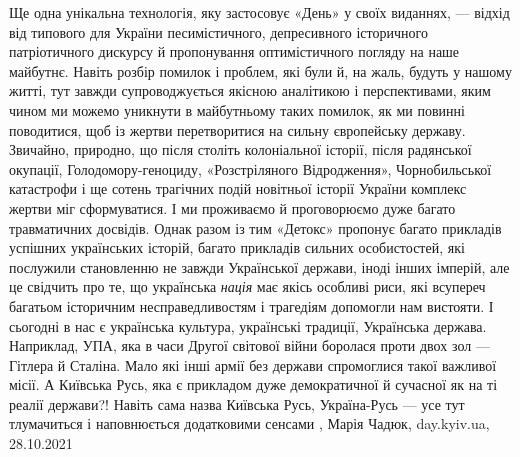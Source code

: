 Ще одна унікальна технологія, яку застосовує «День» у своїх виданнях, — відхід
від типового для України песимістичного, депресивного історичного патріотичного
дискурсу й пропонування оптимістичного погляду на наше майбутнє. Навіть розбір
помилок і проблем, які були й, на жаль, будуть у нашому житті, тут завжди
супроводжується якісною аналітикою і перспективами, яким чином ми можемо
уникнути в майбутньому таких помилок, як ми повинні поводитися, щоб із жертви
перетворитися на сильну європейську державу. Звичайно, природно, що після
століть колоніальної історії, після радянської окупації, Голодомору-геноциду,
«Розстріляного Відродження», Чорнобильської катастрофи і ще сотень трагічних
подій новітньої історії України комплекс жертви міг сформуватися. І ми
проживаємо й проговорюємо дуже багато травматичних досвідів.  Однак разом із
тим «Детокс» пропонує багато прикладів успішних українських історій, багато
прикладів сильних особистостей, які послужили становленню не завжди Української
держави, іноді інших імперій, але це свідчить про те, що українська
\emph{нація} має якісь особливі риси, які всупереч багатьом історичним
несправедливостям і трагедіям допомогли нам вистояти. І сьогодні в нас є
українська культура, українські традиції, Українська держава. Наприклад, УПА,
яка в часи Другої світової війни боролася проти двох зол — Гітлера й Сталіна.
Мало які інші армії без держави спромоглися такої важливої місії. А Київська
Русь, яка є прикладом дуже демократичної й сучасної як на ті реалії держави?!
Навіть сама назва Київська Русь, Україна-Русь — усе тут тлумачиться і
наповнюється додатковими сенсами
, 
Марія Чадюк, day.kyiv.ua, 28.10.2021

